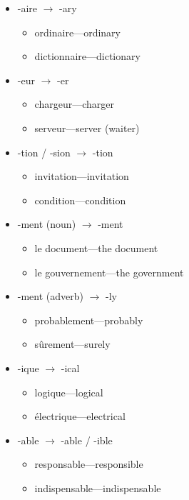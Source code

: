 \begin{itemize}
  \item  -aire $\rightarrow$ -ary
    \begin{itemize}
      \item  ordinaire---ordinary
      \item  dictionnaire---dictionary
    \end{itemize}
  \item  -eur $\rightarrow$ -er
    \begin{itemize}
      \item  chargeur---charger
      \item  serveur---server (waiter) 
    \end{itemize}
  \item  -tion / -sion $\rightarrow$ -tion
    \begin{itemize}
      \item  invitation---invitation
      \item  condition---condition
    \end{itemize}
  \item  -ment (noun) $\rightarrow$ -ment
    \begin{itemize}
      \item  le document---the document
      \item  le gouvernement---the government
    \end{itemize}
  \item  -ment (adverb) $\rightarrow$ -ly
    \begin{itemize}
      \item  probablement---probably
      \item  s{\^u}rement---surely
    \end{itemize}
  \item  -ique $\rightarrow$ -ical
    \begin{itemize}
      \item  logique---logical
      \item  {\'e}lectrique---electrical
    \end{itemize}
  \item  -able $\rightarrow$ -able / -ible
    \begin{itemize}
      \item  responsable---responsible
      \item  indispensable---indispensable
    \end{itemize}
\end{itemize}

